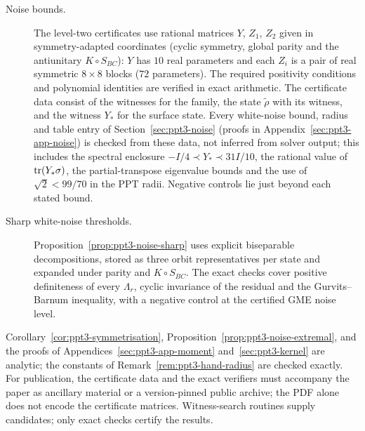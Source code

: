 \begin{description}
\item[Noise bounds.]
The level-two certificates use rational matrices $Y$, $Z_1$, $Z_2$ given in symmetry-adapted coordinates (cyclic symmetry, global
parity and the antiunitary $K\circ S_{BC}$): $Y$ has $10$ real parameters and each $Z_i$ is a pair of real symmetric $8\times8$
blocks ($72$ parameters). The required positivity conditions
and polynomial identities are verified in exact arithmetic. The certificate data consist of the witnesses for the family, the state $\tilde\rho$ with
its witness, and the witness $Y_*$ for the surface state. Every white-noise bound, radius and table entry of
Section~\ref{sec:ppt3-noise} (proofs in Appendix~\ref{sec:ppt3-app-noise}) is checked from these data, not inferred from solver output; this includes the spectral
enclosure $-I/4\prec Y_*\prec31I/10$, the rational value of $\operatorname{tr}(Y_*\sigma)$, the partial-transpose eigenvalue
bounds and the use of $\sqrt2<99/70$ in the PPT radii. Negative controls lie just beyond each stated
bound.

\item[Sharp white-noise thresholds.]
Proposition~\ref{prop:ppt3-noise-sharp} uses explicit biseparable decompositions, stored as three orbit representatives per state
and expanded under parity and $K\circ S_{BC}$. The exact checks cover positive
definiteness of every $\Lambda_r$, cyclic invariance of the residual and the Gurvits--Barnum inequality, with a negative
control at the certified GME noise level.
\end{description}

Corollary~\ref{cor:ppt3-symmetrisation}, Proposition~\ref{prop:ppt3-noise-extremal}, and the proofs of Appendices~\ref{sec:ppt3-app-moment} and~\ref{sec:ppt3-kernel} are analytic; the constants of Remark~\ref{rem:ppt3-hand-radius} are checked exactly. For publication, the
certificate data and the exact verifiers must accompany the paper as ancillary material or a version-pinned public
archive; the PDF alone does not encode the certificate matrices. Witness-search routines supply candidates; only exact checks certify the results.

